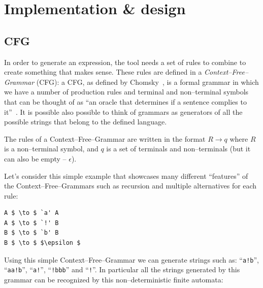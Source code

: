 \documentclass[]{usiinfbachelorproject}
\begin{document}
\newpage

\section{Implementation \& design}\label{impl}

\subsection{CFG}\label{impl-cfg}





In order to generate an expression, the tool needs a set of rules to combine to
create something that makes sense.
These rules are defined in a \textit{Context–Free–Grammar} (CFG): a CFG, as
defined by Chomsky~\cite{chomsky2002syntactic}, is a formal grammar in which
we have a number of production rules and terminal and non–terminal symbols
that can be thought of as ``an oracle that determines if a sentence complies
to it''~\cite{paradiselost}. It is possible also possible to think of grammars
as generators of all the possible strings that belong to the defined language.

The rules of a Context–Free–Grammar are written in the format $ R \to q $
where $ R $ is a non–terminal symbol, and $ q $ is a set of terminals and
non–terminals (but it can also be empty – $ \epsilon $).

Let's consider this simple example that showcases many different ``features''
of the Context–Free–Grammars such as recursion and multiple alternatives for
each rule:

\begin{lstlisting}
A $ \to $ `a' A
A $ \to $ `!' B
B $ \to $ `b' B
B $ \to $ $\epsilon $
\end{lstlisting}

Using this simple Context–Free–Grammar we can generate strings such as:
``\texttt{a!b}'', ``\texttt{aa!b}'', ``\texttt{a!}'', ``\texttt{!bbb}'' and
``\texttt{!}''. In particular all the strings generated by this grammar can be
recognized by this non–deterministic finite automata:
\end{document}
